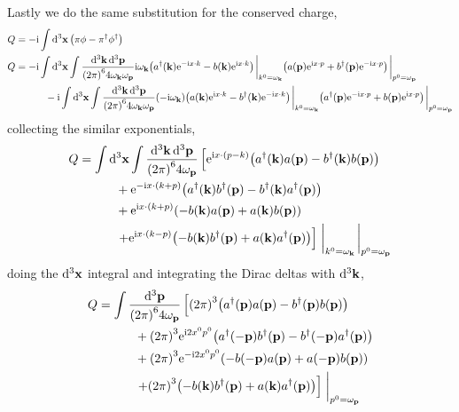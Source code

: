 Lastly we do the same substitution for the conserved charge,
\begin{align}
    Q&=-\im\int\dd[3]{\vb x}\qty(\pi\phi-\pi^\dagger\phi^\dagger)\\
    Q&=-\im\int\dd[3]{\vb x}\int\frac{\dd[3]{\vb k}\dd[3]{\vb p}}{\qty(2\pi)^64\omega_{\vb k}\omega_{\vb p}}\im\omega_{\vb k}\qty(a^\dagger\qty(\vb k)\e^{-\im x\cdot k}-b\qty(\vb k)\e^{\im x\cdot k})\eval_{k^0=\omega_{\vb k}}\qty(a\qty(\vb p)\e^{\im x\cdot p}+b^\dagger\qty(\vb p)\e^{-\im x\cdot p})\eval_{p^0=\omega_{\vb p}}\nonumber\\
    &\quad\quad\quad-\im\int\dd[3]{\vb x}\int\frac{\dd[3]{\vb k}\dd[3]{\vb p}}{\qty(2\pi)^64\omega_{\vb k}\omega_{\vb p}}\qty(-\im\omega_{\vb k})\qty(a\qty(\vb k)\e^{\im x\cdot k}-b^\dagger\qty(\vb k)\e^{-\im x\cdot k})\eval_{k^0=\omega_{\vb k}}\qty(a^\dagger\qty(\vb p)\e^{-\im x\cdot p}+b\qty(\vb p)\e^{\im x\cdot p})\eval_{p^0=\omega_{\vb p}}
\end{align}
collecting the similar exponentials,
\begin{align}
    Q&=\int\dd[3]{\vb x}\int\frac{\dd[3]{\vb k}\dd[3]{\vb p}}{\qty(2\pi)^64\omega_{\vb p}}\left[\e^{\im x\cdot\qty(p-k)}\qty(a^\dagger\qty(\vb k)a\qty(\vb p)-b^\dagger\qty(\vb k)b\qty(\vb p))\right.\nonumber\\
    &\quad\quad\quad+\e^{-\im x\cdot\qty(k+p)}\qty(a^\dagger\qty(\vb k)b^\dagger\qty(\vb p)-b^\dagger\qty(\vb k)a^\dagger\qty(\vb p))\nonumber\\
    &\quad\quad\quad+\e^{\im x\cdot\qty(k+p)}\qty(-b\qty(\vb k)a\qty(\vb p)+a\qty(\vb k)b\qty(\vb p))\nonumber\\
    &\quad\quad\quad\left.+\e^{\im x \cdot\qty(k-p)}\qty(-b\qty(\vb k)b^\dagger\qty(\vb p)+a\qty(\vb k)a^\dagger\qty(\vb p))\right]\eval_{k^0=\omega_{\vb k}}\eval_{p^0=\omega_{\vb p}}
\end{align}
doing the $\dd[3]{\vb x}$ integral and integrating the Dirac deltas with $\dd[3]{\vb k}$,
\begin{align}
    Q&=\int\frac{\dd[3]{\vb p}}{\qty(2\pi)^64\omega_{\vb p}}\left[\qty(2\pi)^3\qty(a^\dagger\qty(\vb p)a\qty(\vb p)-b^\dagger\qty(\vb p)b\qty(\vb p))\right.\nonumber\\
    &\quad\quad\quad+\qty(2\pi)^3\e^{\im 2x^0p^0}\qty(a^\dagger\qty(-\vb p)b^\dagger\qty(\vb p)-b^\dagger\qty(-\vb p)a^\dagger\qty(\vb p))\nonumber\\
    &\quad\quad\quad+\qty(2\pi)^3\e^{-\im2 x^0p^0}\qty(-b\qty(-\vb p)a\qty(\vb p)+a\qty(-\vb p)b\qty(\vb p))\nonumber\\
    &\quad\quad\quad\left.+\qty(2\pi)^3\qty(-b\qty(\vb k)b^\dagger\qty(\vb p)+a\qty(\vb k)a^\dagger\qty(\vb p))\right]\eval_{p^0=\omega_{\vb p}}
\end{align}
